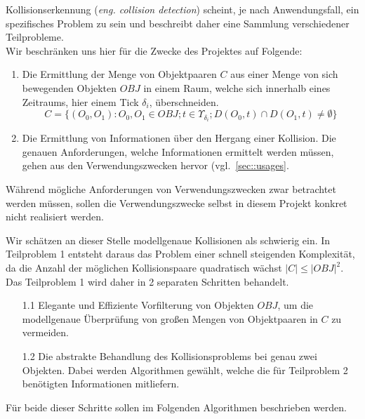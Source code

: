 Kollisionserkennung (\textit{eng. collision detection}) scheint, je nach Anwendungsfall, ein spezifisches Problem zu sein und beschreibt daher eine Sammlung verschiedener Teilprobleme.\\
Wir beschränken uns hier für die Zwecke des Projektes auf Folgende:
\begin{enumerate}
\item Die Ermittlung der Menge von Objektpaaren $C$ aus einer Menge von sich bewegenden Objekten $OBJ$ in einem Raum, welche sich innerhalb eines Zeitraums, hier einem Tick $\delta_i$, überschneiden.
$$C = \{(O_0, O_1) : O_0, O_1 \in OBJ; t\in \Upsilon_{\delta_i};  D(O_0, t) \cap D(O_1, t) \neq \emptyset\}$$
\item Die Ermittlung von Informationen über den Hergang einer Kollision.
Die genauen Anforderungen, welche Informationen ermittelt werden müssen, gehen aus den Verwendungszwecken hervor (vgl.~\ref{sec::usages}. 
\end{enumerate}

Während mögliche Anforderungen von Verwendungszwecken zwar betrachtet werden müssen, sollen die Verwendungszwecke selbst in diesem Projekt konkret nicht realisiert werden.

Wir schätzen an dieser Stelle modellgenaue Kollisionen als schwierig ein. In Teilproblem 1 entsteht daraus das Problem einer schnell steigenden Komplexität, da die Anzahl der möglichen Kollisionspaare quadratisch wächst $|C|\leq |OBJ|^2$.\\
Das Teilproblem 1 wird daher in 2 separaten Schritten behandelt.
\begin{itemize}
\item[1.1] Elegante und Effiziente Vorfilterung von Objekten $OBJ$, um die modellgenaue Überprüfung von großen Mengen von Objektpaaren in $C$ zu vermeiden.
\item[1.2] Die abstrakte Behandlung des Kollisionsproblems bei genau zwei Objekten. Dabei werden Algorithmen gewählt, welche die für Teilproblem 2 benötigten Informationen mitliefern.
\end{itemize}

Für beide dieser Schritte sollen im Folgenden Algorithmen beschrieben werden.


